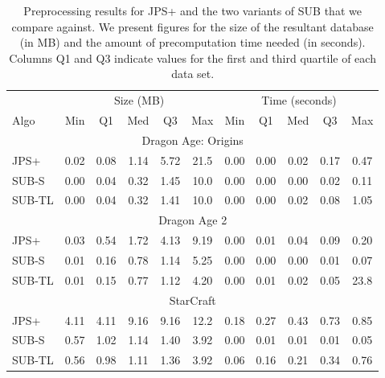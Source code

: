 {\setlength{\tabcolsep}{0.4em}
\begin{table}[b!]
\tiny
\centering
\begin{tabular}{l|ccccc|ccccc}
  \hline
 &  \multicolumn{5}{|c|}{Size (MB)} & \multicolumn{5}{c}{Time (seconds)} \\ 
Algo & Min & Q1 & Med & Q3 & Max & Min & Q1 & Med & Q3 & Max \\ \hline
\multicolumn{11}{c}{Dragon Age: Origins}  \\ \hline
JPS+ & 0.02 & 0.08 & 1.14 & 5.72 & 21.5 & 0.00 & 0.00 & 0.02 & 0.17 & 0.47 \\ 
SUB-S & 0.00 & 0.04 & 0.32 & 1.45 & 10.0 & 0.00 & 0.00 & 0.00 & 0.02 & 0.11 \\ 
SUB-TL & 0.00 & 0.04 & 0.32 & 1.41 & 10.0 & 0.00 & 0.00 & 0.02 & 0.08 & 1.05 \\  \hline
\multicolumn{11}{c}{Dragon Age 2}  \\ \hline

 JPS+ & 0.03 & 0.54 & 1.72 & 4.13 & 9.19 & 0.00 & 0.01 & 0.04 & 0.09 & 0.20 \\ 
 SUB-S & 0.01 & 0.16 & 0.78 & 1.14 & 5.25 & 0.00 & 0.00 & 0.00 & 0.01 & 0.07 \\ 
 SUB-TL & 0.01 & 0.15 & 0.77 & 1.12 & 4.20 & 0.00 & 0.01 & 0.02 & 0.05 & 23.8 \\ \hline
 \multicolumn{11}{c}{StarCraft}  \\ \hline

 JPS+ & 4.11 & 4.11 & 9.16 & 9.16 & 12.2 & 0.18 & 0.27 & 0.43 & 0.73 & 0.85 \\ 
 SUB-S & 0.57 & 1.02 & 1.14 & 1.40 & 3.92 & 0.00 & 0.01 & 0.01 & 0.01 & 0.05 \\ 
 SUB-TL & 0.56 & 0.98 & 1.11 & 1.36 & 3.92 & 0.06 & 0.16 & 0.21 & 0.34 & 0.76 \\ \hline
\end{tabular}
\vspace{1em}
\caption{\small Preprocessing results for JPS+ and the two variants of SUB that we compare against. 
We present figures for the size of the resultant database (in MB) and the amount of
precomputation time needed (in seconds). Columns Q1 and Q3 indicate values for the 
first and third quartile of each data set.}
\label{table::preproc}
\end{table}
}
